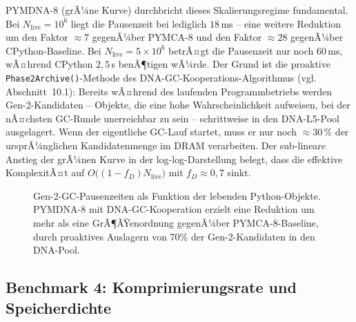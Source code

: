﻿\documentclass[a4paper,12pt]{article}
\theoremstyle{definition}
\begin{document}
PYMDNA-8 (grÃ¼ne Kurve) durchbricht dieses Skalierungsregime fundamental. Bei $N_{\mathrm{live}} = 10^6$ liegt die Pausenzeit bei lediglich $18$\,ms -- eine weitere Reduktion um den Faktor $\approx 7$ gegenÃ¼ber PYMCA-8 und den Faktor $\approx 28$ gegenÃ¼ber CPython-Baseline. Bei $N_{\mathrm{live}} = 5 \times 10^6$ betrÃ¤gt die Pausenzeit nur noch $60$\,ms, wÃ¤hrend CPython $2{,}5$\,s benÃ¶tigen wÃ¼rde. Der Grund ist die proaktive \texttt{Phase2Archive()}-Methode des DNA-GC-Kooperations-Algorithmus (vgl. Abschnitt~10.1): Bereits wÃ¤hrend des laufenden Programmbetriebs werden Gen-2-Kandidaten -- Objekte, die eine hohe Wahrscheinlichkeit aufweisen, bei der nÃ¤chsten GC-Runde unerreichbar zu sein -- schrittweise in den DNA-L5-Pool ausgelagert. Wenn der eigentliche GC-Lauf startet, muss er nur noch $\approx 30$\,\% der ursprÃ¼nglichen Kandidatenmenge im DRAM verarbeiten. Der sub-lineare Anstieg der grÃ¼nen Kurve in der log-log-Darstellung belegt, dass die effektive KomplexitÃ¤t auf $O\bigl((1-f_D) N_{\mathrm{live}}\bigr)$ mit $f_D \approx 0{,}7$ sinkt.

\begin{figure}[H]
  \centering
  \caption{Gen-2-GC-Pausenzeiten als Funktion der lebenden Python-Objekte.
    PYMDNA-8 mit DNA-GC-Kooperation erzielt eine Reduktion um mehr als
    eine GrÃ¶ÃŸenordnung gegenÃ¼ber PYMCA-8-Baseline,
    durch proaktives Auslagern von 70\% der Gen-2-Kandidaten in den DNA-Pool.}
  \label{fig:gc_pausenzeiten}
\end{figure}

\subsection{Benchmark 4: Komprimierungsrate und Speicherdichte}
\end{document}
